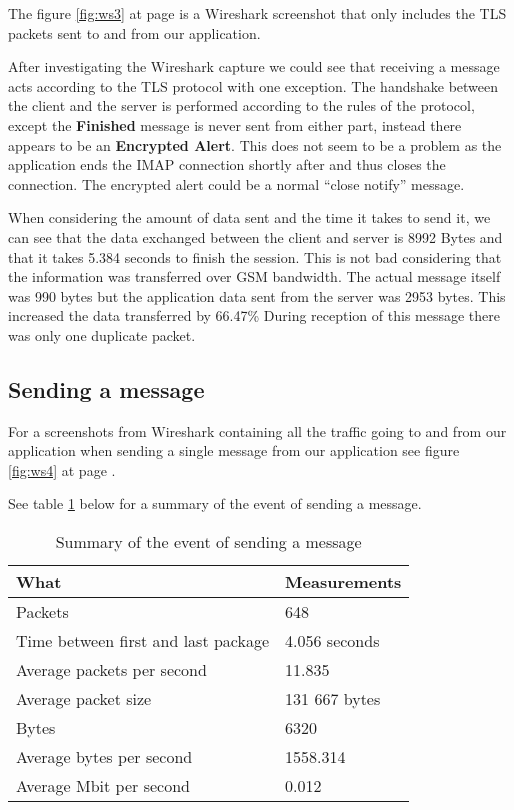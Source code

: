The figure \ref{fig:ws3} at page \pageref{fig:ws3} is a Wireshark screenshot that only includes the TLS packets sent to and from our application.
\newline

After investigating the Wireshark capture we could see that receiving a message acts according to the TLS protocol with one exception. The handshake between the client and the server is performed according to the rules of the protocol, except the \textbf{Finished}  message is never sent from either part, instead there appears to be an \textbf{Encrypted Alert}. This does not seem to be a problem as the application ends the IMAP connection shortly after and thus closes the connection. The encrypted alert could be a normal “close notify” message.

\pagebreak

When considering the amount of data sent and the time it takes to send it, we can see that the data exchanged between the client and server is 8992 Bytes and that it takes 5.384 seconds to finish the session. This is not bad considering that the information was transferred over GSM bandwidth. The actual message itself was 990 bytes but the application data sent from the server was 2953 bytes. This increased the data transferred by 66.47\% During reception of this message there was only one duplicate packet.

\subsection{Sending a message}

For a screenshots from Wireshark containing all the traffic going to and from our application when sending a single message from our application see figure \ref{fig:ws4} at page \pageref{fig:ws4}.

See table \ref{tab:summarysenmes} below for a summary of the event of sending a message.
\begin{table}[h!]
\begin{center}
\begin{tabular}{l|l} \hline
\textbf{What} & \textbf{Measurements} \\ \hline \hline
Packets & 648 \\
Time between first and last package & 4.056 seconds \\
Average packets per second & 11.835 \\
Average packet size & 131 667 bytes \\
Bytes & 6320 \\
Average bytes per second & 1558.314 \\
Average Mbit per second & 0.012 \\ \hline
\end{tabular}
\end{center}
\caption{Summary of the event of sending a message} \label{tab:summarysenmes}
\end{table}


